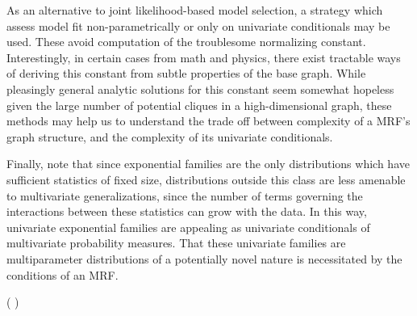 \documentclass{samkoelleprelimworking}
\newcommand{\vmcomment}[1]{({\color{blue}{VM's comment:}} \textbf{\color{blue}{#1}})}
\begin{document}
As an alternative to joint likelihood-based model selection, a strategy which assess model fit non-parametrically or only on univariate conditionals may be used.  These avoid computation of the troublesome normalizing constant.  Interestingly, in certain cases from math and physics, there exist tractable ways of deriving this constant from subtle properties of the base graph.   While pleasingly general analytic solutions for this constant seem somewhat hopeless given the large number of potential cliques in a high-dimensional graph, these methods may help us to understand the trade off between complexity of a MRF's graph structure, and the complexity of its univariate conditionals.

Finally, note that since exponential families are the only distributions which have sufficient statistics of fixed size, distributions outside this class are less amenable to multivariate generalizations, since the number of terms governing the interactions between these statistics can grow with the data.  In this way, univariate exponential families are appealing as univariate conditionals of multivariate probability measures.  That these univariate families are multiparameter distributions of a potentially novel nature is necessitated by the conditions of an MRF.
 
 \vmcomment{Clean up your references and don't forget to protect your capitalization, e.g., Poisson, not poisson.}
 
  
   
\end{document}

